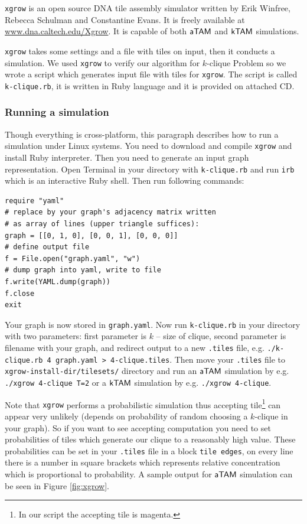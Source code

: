 {\tt xgrow} is an open source DNA tile assembly simulator written by Erik Winfree, Rebecca Schulman and Constantine Evans. It is freely available at \url{www.dna.caltech.edu/Xgrow}. It is capable of both $\mathsf{aTAM}$ and $\mathsf{kTAM}$ simulations.

{\tt xgrow} takes some settings and a file with tiles on input, then it conducts a simulation. We used {\tt xgrow} to verify our algorithm for $k$-clique Problem so we wrote a script which generates input file with tiles for {\tt xgrow}. The script is called {\tt k-clique.rb}, it is written in Ruby language and it is provided on attached CD.

\subsubsection*{Running a simulation}

Though everything is cross-platform, this paragraph describes how to run a simulation under Linux systems. You need to download and compile {\tt xgrow} and install Ruby interpreter. Then you need to generate an input graph representation. Open Terminal in your directory with {\tt k-clique.rb} and run {\tt irb} which is an interactive Ruby shell. Then run following commands:
\begin{verbatim}
require "yaml"
# replace by your graph's adjacency matrix written
# as array of lines (upper triangle suffices):
graph = [[0, 1, 0], [0, 0, 1], [0, 0, 0]]
# define output file
f = File.open("graph.yaml", "w")
# dump graph into yaml, write to file
f.write(YAML.dump(graph))
f.close
exit
\end{verbatim}
Your graph is now stored in {\tt graph.yaml}. Now run {\tt k-clique.rb} in your directory with two parameters: first parameter is $k$ -- size of clique, second parameter is filename with your graph, and redirect output to a new {\tt *.tiles} file, e.g. {\tt ./k-clique.rb 4 graph.yaml > 4-clique.tiles}. Then move your {\tt *.tiles} file to {\tt xgrow-install-dir/tilesets/} directory and run an $\mathsf{aTAM}$ simulation by e.g. {\tt ./xgrow 4-clique T=2} or a $\mathsf{kTAM}$ simulation by e.g. {\tt ./xgrow 4-clique}.

Note that {\tt xgrow} performs a probabilistic simulation thus accepting tile\footnote{In our script the accepting tile is magenta.} can appear very unlikely (depends on probability of random choosing a $k$-clique in your graph). So if you want to see accepting computation you need to set probabilities of tiles which generate our clique to a reasonably high value. These probabilities can be set in your {\tt *.tiles} file in a block {\tt tile edges}, on every line there is a number in square brackets which represents relative concentration which is proportional to probability. A sample output for $\mathsf{aTAM}$ simulation can be seen in Figure \ref{fig:xgrow}.

